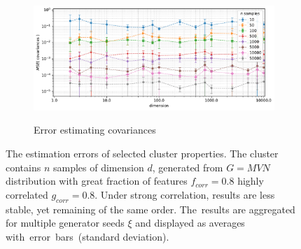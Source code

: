\begin{figure}[t]
    \vspace{-0.5em}
    \begin{subfigure}[b]{0.9\textwidth}
        \centering
        \caption{\small Error estimating covariances}
        \includegraphics[width=\textwidth]{images/estimation/trend-properties-mse_covs(dimension)-n_correlated_0.80-covariance_0.80-samples_10,50,100,500,1000,5000,10000,50000-aggregated.pdf}
        \label{fig:estimation-strong-covariances}
    \end{subfigure}

    \vspace{-0.5em}
    \caption{The estimation errors of selected cluster properties. The cluster contains $n$ samples of dimension $d$, generated from $G = MVN$ distribution with great fraction of features $f_{corr} = 0.8$ highly correlated $g_{corr} = 0.8$. Under strong correlation, results are less stable, yet remaining of the same order. The~results are aggregated for multiple generator seeds $\xi$ and displayed as averages with~error~bars~(standard deviation).}
    \label{fig:estimation-strong}
    \vspace{-2.5em}
\end{figure}

\cleardoublepage{}

